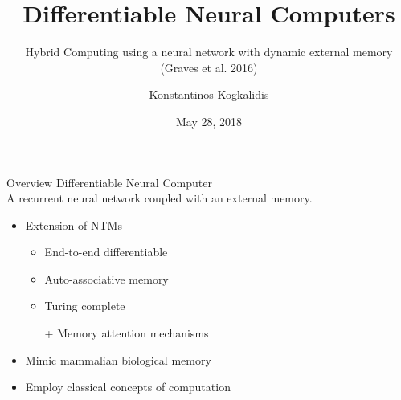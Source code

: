 \documentclass{beamer}
\title{Differentiable Neural Computers}
\subtitle{Hybrid Computing using a neural network with dynamic external memory (Graves et al. 2016)}
\author{Konstantinos Kogkalidis}
\date{May 28, 2018}
\institute{Logic and Computation}
\begin{document}
	\maketitle
	
\begin{frame}{Overview}
	\alert{Differentiable Neural Computer}\\
	A recurrent neural network coupled with an external memory.
	
	\pause
	\begin{itemize}
	\item Extension of NTMs
	\begin{itemize}
		\pause
		\item End-to-end differentiable
		\pause
		\item Auto-associative memory
		\pause
		\item Turing complete
		\pause
		\item[+] Memory attention mechanisms
		\end{itemize}
	\pause
	\item Mimic mammalian biological memory
	\item Employ classical concepts of computation
	\end{itemize}
\end{frame}
\end{document}
